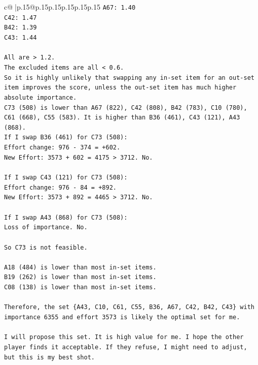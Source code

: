 \documentclass{article}
\begin{document}
{\begin{supertabular}{c@{$\;$}|p{.15\linewidth}@{}p{.15\linewidth}p{.15\linewidth}p{.15\linewidth}p{.15\linewidth}p{.15\linewidth}}
{{{\texttt{A67: 1.40} \\
\texttt{C42: 1.47} \\
\texttt{B42: 1.39} \\
\texttt{C43: 1.44} \\
\\ 
\texttt{All are > 1.2.} \\
\texttt{The excluded items are all < 0.6.} \\
\texttt{So it is highly unlikely that swapping any in{-}set item for an out{-}set item improves the score, unless the out{-}set item has much higher absolute importance.} \\
\texttt{C73 (508) is lower than A67 (822), C42 (808), B42 (783), C10 (780), C61 (668), C55 (583). It is higher than B36 (461), C43 (121), A43 (868).} \\
\texttt{If I swap B36 (461) for C73 (508):} \\
\texttt{Effort change: 976 {-} 374 = +602.} \\
\texttt{New Effort: 3573 + 602 = 4175 > 3712. No.} \\
\\ 
\texttt{If I swap C43 (121) for C73 (508):} \\
\texttt{Effort change: 976 {-} 84 = +892.} \\
\texttt{New Effort: 3573 + 892 = 4465 > 3712. No.} \\
\\ 
\texttt{If I swap A43 (868) for C73 (508):} \\
\texttt{Loss of importance. No.} \\
\\ 
\texttt{So C73 is not feasible.} \\
\\ 
\texttt{A18 (484) is lower than most in{-}set items.} \\
\texttt{B19 (262) is lower than most in{-}set items.} \\
\texttt{C08 (138) is lower than most in{-}set items.} \\
\\ 
\texttt{Therefore, the set \{A43, C10, C61, C55, B36, A67, C42, B42, C43\} with importance 6355 and effort 3573 is likely the optimal set for me.} \\
\\ 
\texttt{I will propose this set. It is high value for me. I hope the other player finds it acceptable. If they refuse, I might need to adjust, but this is my best shot.} \\
\\ 
}}}
\end{supertabular}}
\end{document}
